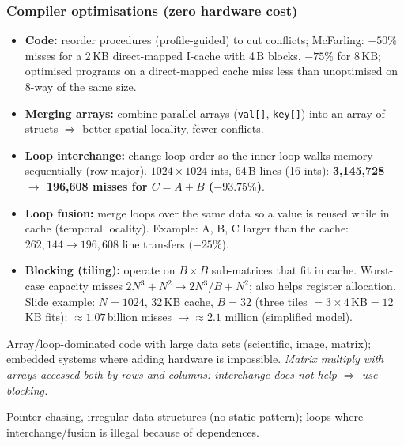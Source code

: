 \subsubsection{Compiler optimisations (zero hardware cost)}
\begin{itemize}
\item \textbf{Code:} reorder procedures (profile-guided) to cut conflicts; McFarling: $-50\%$ misses for a 2\,KB direct-mapped I-cache with 4\,B blocks, $-75\%$ for 8\,KB; optimised programs on a direct-mapped cache miss less than unoptimised on 8-way of the same size.
\item \textbf{Merging arrays:} combine parallel arrays (\texttt{val[]}, \texttt{key[]}) into an array of structs $\Rightarrow$ better spatial locality, fewer conflicts.
\item \textbf{Loop interchange:} change loop order so the inner loop walks memory sequentially (row-major). $1024\times1024$ ints, 64\,B lines (16 ints): \textbf{3{,}145{,}728 $\rightarrow$ 196{,}608 misses for $C=A+B$ ($-93.75\%$)}.
\item \textbf{Loop fusion:} merge loops over the same data so a value is reused while in cache (temporal locality). Example: A, B, C larger than the cache: $262{,}144 \rightarrow 196{,}608$ line transfers ($-25\%$).
\item \textbf{Blocking (tiling):} operate on $B\times B$ sub-matrices that fit in cache. Worst-case capacity misses $2N^3+N^2 \rightarrow 2N^3/B+N^2$; also helps register allocation. Slide example: $N=1024$, 32\,KB cache, $B=32$ (three tiles $=3\times4$\,KB$=12$\,KB fits): $\approx1.07$\,billion misses $\rightarrow\approx2.1$ million (simplified model).
\end{itemize}
\begin{pick}
Array/loop-dominated code with large data sets (scientific, image, matrix); embedded systems where adding hardware is impossible. \emph{Matrix multiply with arrays accessed both by rows and columns: interchange does not help $\Rightarrow$ use blocking.}
\end{pick}
\begin{avoid}
Pointer-chasing, irregular data structures (no static pattern); loops where interchange/fusion is illegal because of dependences.
\end{avoid}

